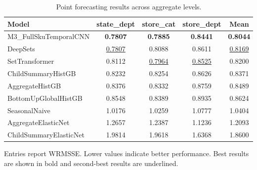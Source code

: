 \begin{table}[H]
\centering
\caption{Point forecasting results across aggregate levels.}
\label{tab:main_point}
\begin{threeparttable}
\begin{tabular}{lcccc}
\toprule
Model & state\_dept & store\_cat & store\_dept & Mean \\
\midrule
M3\_FullSkuTemporalCNN & \textbf{0.7807} & \textbf{0.7885} & \textbf{0.8441} & \textbf{0.8044} \\
DeepSets & \underline{0.7807} & 0.8088 & 0.8611 & \underline{0.8169} \\
SetTransformer & 0.8112 & \underline{0.7964} & \underline{0.8525} & 0.8200 \\
ChildSummaryHistGB & 0.8232 & 0.8254 & 0.8626 & 0.8371 \\
AggregateHistGB & 0.8376 & 0.8332 & 0.8759 & 0.8489 \\
BottomUpGlobalHistGB & 0.8548 & 0.8389 & 0.8935 & 0.8624 \\
SeasonalNaive & 1.0176 & 1.0259 & 1.0777 & 1.0404 \\
AggregateElasticNet & 1.2657 & 1.2387 & 1.1236 & 1.2093 \\
ChildSummaryElasticNet & 1.9814 & 1.9618 & 1.6368 & 1.8600 \\
\bottomrule
\end{tabular}
\begin{tablenotes}
\footnotesize \item Entries report WRMSSE. Lower values indicate better performance. Best results are shown in bold and second-best results are underlined.
\end{tablenotes}
\end{threeparttable}
\end{table}
